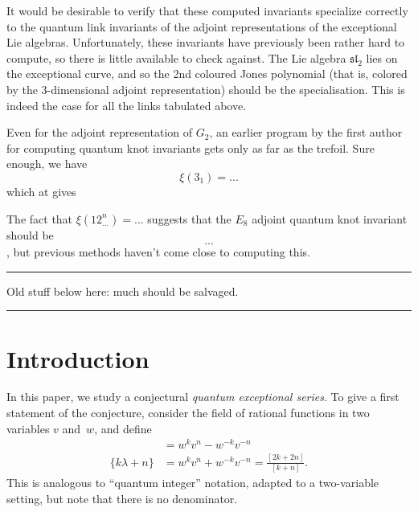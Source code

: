 \documentclass[12pt]{amsart}
\begin{document}
It would be desirable to verify that these computed invariants specialize correctly to the
quantum link invariants of the adjoint representations of the exceptional Lie algebras.
Unfortunately, these invariants have previously been rather hard to compute, so there is little
available to check against. The Lie algebra $\mathfrak{sl}_2$ lies on the exceptional curve, and
so the 2nd coloured Jones polynomial 
(that is, colored by the 3-dimensional adjoint representation) 
should be the  specialisation. This is indeed the case for all the links
tabulated above.

Even for the adjoint representation of $G_2$, an earlier program by the first author
for computing quantum knot invariants gets only as far as the trefoil. Sure enough, we have
$$\xi(3_1) = ...$$
which at  gives 


The fact that $\xi(12^n_{...}) = ...$ suggests that the $E_8$ adjoint quantum knot invariant should be
$$...$$, but previous methods haven't come close to computing this.

\vspace{1cm}
\hrule
\vspace{1cm}

Old stuff below here: much should be salvaged.

\vspace{1cm}
\hrule
\vspace{1cm}


\appendix

\section{Introduction}
\label{sec:introduction}

In this paper, we study a conjectural \emph{quantum exceptional
  series}. To give a first statement of the conjecture, consider the
field of rational functions in two variables $v$ and~$w$, and define
\begin{align*}
[k\lambda + n] &= w^kv^n - w^{-k}v^{-n}\\
\{k\lambda + n\} &= w^k v^n + w^{-k} v^{-n} = \frac{[2k+2n]}{[k+n]}.
\end{align*}
This is analogous to ``quantum integer'' notation, adapted to a
two-variable setting, but note that there is no denominator.
\end{document}
